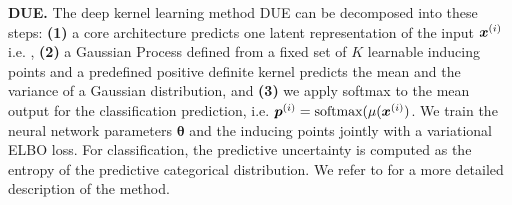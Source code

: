 


\textbf{DUE.} The deep kernel learning method DUE \citep{van2021due} can be decomposed into these steps: \textbf{(1)} a core architecture predicts one latent representation of the input $\bm{x}^{(i)}$ i.e. , 
\textbf{(2)} a Gaussian Process defined from a fixed set of $K$ learnable inducing points  and a predefined positive definite kernel \smash{$\kappa(\cdot, \cdot)$} predicts the mean  and the variance  of a Gaussian distribution, and 
\textbf{(3)} we apply softmax to the mean output  for the classification prediction, i.e. $\bm{p}^{(i)} = \text{softmax}(\mu(\bm{x}^{(i)})$. We train the neural network parameters $\bm{\theta}$ and the inducing points  jointly with a variational ELBO loss. %
For classification, the predictive uncertainty is computed as the entropy of the predictive categorical distribution. 
We refer to \citep{van2021due} for a more detailed description of the method.

